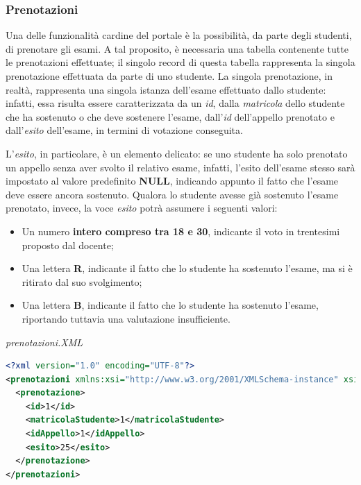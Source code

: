 \documentclass [a4paper,11pt]{book}
\begin{document}
\medskip

\subsubsection{Prenotazioni}

\label{sec:esito}

Una delle funzionalità cardine del portale è la possibilità, da parte degli studenti, di prenotare gli esami. A tal proposito, è necessaria una tabella contenente tutte le prenotazioni effettuate; il singolo record di questa tabella rappresenta la singola prenotazione effettuata da parte di uno studente. La singola prenotazione, in realtà, rappresenta una singola istanza dell'esame effettuato dallo studente: infatti, essa risulta essere caratterizzata da un \emph{id}, dalla \emph{matricola} dello studente che ha sostenuto o che deve sostenere l'esame, dall'\emph{id} dell'appello prenotato e dall'\emph{esito} dell'esame, in termini di votazione conseguita.

L'\emph{esito}, in particolare, è un elemento delicato: se uno studente ha solo prenotato un appello senza aver svolto il relativo esame, infatti, l'esito dell'esame stesso sarà impostato al valore predefinito \textbf{NULL}, indicando appunto il fatto che l'esame deve essere ancora sostenuto. Qualora lo studente avesse già sostenuto l'esame prenotato, invece, la voce \emph{esito} potrà assumere i seguenti valori:
\begin{itemize}
\item Un numero \textbf{intero compreso tra 18 e 30}, indicante il voto in trentesimi proposto dal docente;
\item Una lettera \textbf{R}, indicante il fatto che lo studente ha sostenuto l'esame, ma si è ritirato dal suo svolgimento;
\item Una lettera \textbf{B}, indicante il fatto che lo studente ha sostenuto l'esame, riportando tuttavia una valutazione insufficiente.
\end{itemize}

\medskip

\emph{prenotazioni.XML}

\label{sec:prenotazioni}

\begin{lstlisting}[language=XML]
<?xml version="1.0" encoding="UTF-8"?>
<prenotazioni xmlns:xsi="http://www.w3.org/2001/XMLSchema-instance" xsi:noNamespaceSchemaLocation="prenotazione.xsd">
  <prenotazione>
    <id>1</id>
    <matricolaStudente>1</matricolaStudente>
    <idAppello>1</idAppello>
    <esito>25</esito>
  </prenotazione>
</prenotazioni>
\end{lstlisting}
\end{document}
